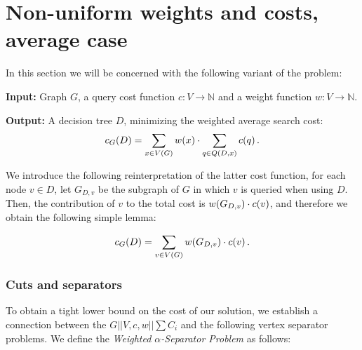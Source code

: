 \section{Non-uniform weights and costs, average case}
In this section we will be concerned with the following variant of the problem:
\begin{tcolorbox}[colback=white, title=$G||V,c,w||\sum C_j$, fonttitle=\bfseries, breakable]
\textbf{Input:} Graph $G$, a query cost function $c:V\to \mathbb{N}$ and a weight function $w:V\to \mathbb{N}$.

\textbf{Output:} A decision tree $D$, minimizing the weighted average search cost: 
$$
c_G\mathopen{}\left( D \right) = \sum_{x\in V\mathopen{}\left( G \right)}w\mathopen{}\left( x \right)\cdot \sum_{q\in Q\mathopen{}\left( D, x \right)}c\mathopen{}\left( q \right).
$$
\end{tcolorbox}
We introduce the following reinterpretation of the latter cost function, 
for each node $v \in D$, let $G_{D,v}$ be the subgraph of $G$ in which 
$v$ is queried when using $D$. 
Then, the contribution of $v$ to the total cost is $w\mathopen{}\left( G_{D,v} \right) \cdot c\mathopen{}\left( v \right)$, 
and therefore we obtain the following simple lemma:

\begin{lemma}\label{contributionLemma}
$$
c_G\mathopen{}\left( D \right) = \sum_{v \in V\mathopen{}\left( G \right)} w\mathopen{}\left( G_{D,v} \right) \cdot c\mathopen{}\left( v \right).
$$  
\end{lemma}
\subsubsection{Cuts and separators}\label{cutsAndSeparators}
To obtain a tight lower bound on the cost of our solution, 
we establish a connection between the $G||V,c,w||\sum C_i$ and the following 
vertex separator problems. 
We define the \textit{Weighted $\alpha$-Separator Problem} as follows:


